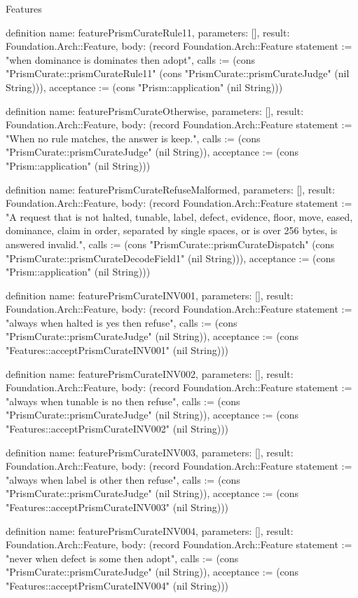 \begin{lexlean}{Features}
\begin{semanticmodule}
definition{
  name: featurePrismCurateRule11,
  parameters: [],
  result: Foundation.Arch::Feature,
  body: (record Foundation.Arch::Feature {statement := "when dominance is dominates then adopt", calls := (cons "PrismCurate::prismCurateRule11" (cons "PrismCurate::prismCurateJudge" (nil String))), acceptance := (cons "Prism::application" (nil String))})
}

definition{
  name: featurePrismCurateOtherwise,
  parameters: [],
  result: Foundation.Arch::Feature,
  body: (record Foundation.Arch::Feature {statement := "When no rule matches, the answer is keep.", calls := (cons "PrismCurate::prismCurateJudge" (nil String)), acceptance := (cons "Prism::application" (nil String))})
}

definition{
  name: featurePrismCurateRefuseMalformed,
  parameters: [],
  result: Foundation.Arch::Feature,
  body: (record Foundation.Arch::Feature {statement := "A request that is not halted, tunable, label, defect, evidence, floor, move, eased, dominance, claim in order, separated by single spaces, or is over 256 bytes, is answered invalid.", calls := (cons "PrismCurate::prismCurateDispatch" (cons "PrismCurate::prismCurateDecodeField1" (nil String))), acceptance := (cons "Prism::application" (nil String))})
}

definition{
  name: featurePrismCurateINV001,
  parameters: [],
  result: Foundation.Arch::Feature,
  body: (record Foundation.Arch::Feature {statement := "always when halted is yes then refuse", calls := (cons "PrismCurate::prismCurateJudge" (nil String)), acceptance := (cons "Features::acceptPrismCurateINV001" (nil String))})
}

definition{
  name: featurePrismCurateINV002,
  parameters: [],
  result: Foundation.Arch::Feature,
  body: (record Foundation.Arch::Feature {statement := "always when tunable is no then refuse", calls := (cons "PrismCurate::prismCurateJudge" (nil String)), acceptance := (cons "Features::acceptPrismCurateINV002" (nil String))})
}

definition{
  name: featurePrismCurateINV003,
  parameters: [],
  result: Foundation.Arch::Feature,
  body: (record Foundation.Arch::Feature {statement := "always when label is other then refuse", calls := (cons "PrismCurate::prismCurateJudge" (nil String)), acceptance := (cons "Features::acceptPrismCurateINV003" (nil String))})
}

definition{
  name: featurePrismCurateINV004,
  parameters: [],
  result: Foundation.Arch::Feature,
  body: (record Foundation.Arch::Feature {statement := "never when defect is some then adopt", calls := (cons "PrismCurate::prismCurateJudge" (nil String)), acceptance := (cons "Features::acceptPrismCurateINV004" (nil String))})
}


\end{semanticmodule}
\end{lexlean}
